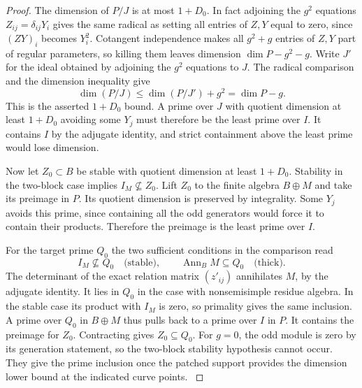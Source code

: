 \begin{proof}
The dimension of \(P/J\) is at most \(1+D_0\).
In fact adjoining the \(g^2\) equations
\(Z_{ij}=\delta_{ij}Y_i\) gives the same radical as
setting all entries of \(Z,Y\) equal to zero,
since \((ZY)_i\) becomes \(Y_i^2\).
Cotangent independence makes all \(g^2+g\) entries of
\(Z,Y\) part of regular parameters, so killing them leaves
dimension \(\dim P-g^2-g\). Write \(J'\) for the ideal
obtained by adjoining the \(g^2\) equations to \(J\).
The radical comparison and the dimension inequality give
\[
       \dim(P/J)\le\dim(P/J')+g^2=\dim P-g .
\]
This is the asserted \(1+D_0\) bound. A prime over \(J\)
with quotient dimension at least \(1+D_0\) avoiding
some \(Y_j\) must therefore be the least prime over \(I\).
It contains \(I\) by the adjugate identity, and
strict containment above the least prime would
lose dimension.

Now let \(Z_0\subset B\) be stable with quotient
dimension at least \(1+D_0\). Stability in the
two-block case implies \(I_M\not\subseteq Z_0\).
Lift \(Z_0\) to the finite algebra \(B\oplus M\)
and take its preimage in \(P\). Its quotient
dimension is preserved by integrality. Some
\(Y_j\) avoids this prime, since containing all
the odd generators would force it to contain
their products. Therefore the preimage is the
least prime over \(I\).

For the target prime \(Q_0\) the two sufficient conditions in the comparison read
\[
 I_M\not\subseteq Q_0\quad\text{(stable)},\qquad \operatorname{Ann}_B M\subseteq Q_0\quad\text{(thick)} .
\] The determinant of the
exact relation matrix \((z'_{ij})\) annihilates
\(M\), by the adjugate identity. It lies in
\(Q_0\) in the case with nonsemisimple residue algebra. In the stable case its
product with \(I_M\) is zero, so primality gives
the same inclusion. A prime over \(Q_0\) in
\(B\oplus M\) thus pulls back to a prime over \(I\)
in \(P\). It contains the preimage for \(Z_0\).
Contracting gives \(Z_0\subseteq Q_0\).
For \(g=0\), the odd module is zero by its generation
statement, so the two-block stability hypothesis
cannot occur.
They give the prime inclusion once the patched
support provides the dimension lower bound at
the indicated curve points. \label{cor:ordinary-patching-cotangent-14}
\end{proof}
